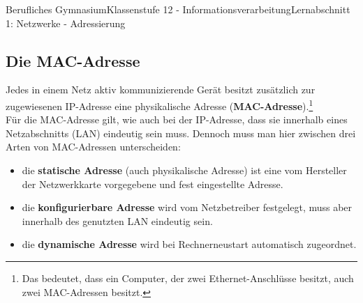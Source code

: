 \documentclass[11pt,oneside,openany,headings=optiontotoc,11pt,numbers=noenddot]{article}
\begin{document}
\begin{worksheet}{Berufliches Gymnasium}{Klassenstufe 12 - Informationsverarbeitung}{Lernabschnitt 1: Netzwerke - Adressierung}
		\subsection{Die MAC-Adresse}
		Jedes in einem Netz aktiv kommunizierende Gerät besitzt zusätzlich zur zugewiesenen IP-Adresse eine physikalische Adresse (\textbf{MAC-Adresse}).\footnote{Das bedeutet, dass ein Computer, der zwei Ethernet-Anschlüsse besitzt, auch zwei MAC-Adressen besitzt.}\\
		Für die MAC-Adresse gilt, wie auch bei der IP-Adresse, dass sie innerhalb eines Netzabschnitts (LAN) eindeutig sein muss. Dennoch muss man hier zwischen drei Arten von MAC-Adressen unterscheiden:
		\begin{itemize}
			\item die \textbf{statische Adresse} (auch physikalische Adresse) ist eine vom Hersteller der Netzwerkkarte vorgegebene und fest eingestellte Adresse.
			\item die \textbf{konfigurierbare Adresse} wird vom Netzbetreiber festgelegt, muss aber innerhalb des genutzten LAN eindeutig sein.
			\item die \textbf{dynamische Adresse} wird bei Rechnerneustart automatisch zugeordnet.
		\end{itemize}
	\end{worksheet}
\end{document}
